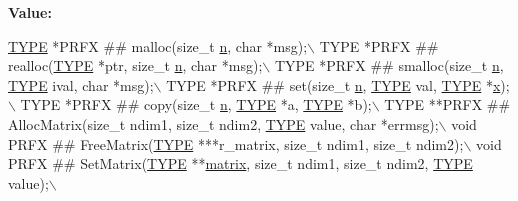 {\bfseries Value\+:}
\begin{DoxyCode}
\hyperlink{a00608_a0bc6723d5d4776ab7cdc646728b775f7}{TYPE}  *PRFX ## malloc(\textcolor{keywordtype}{size\_t} \hyperlink{a00563_a4c2d80ab32fc3a598413ae25e9f2bdce}{n}, \textcolor{keywordtype}{char} *msg);\(\backslash\)
  TYPE  *PRFX ## realloc(\hyperlink{a00608_a0bc6723d5d4776ab7cdc646728b775f7}{TYPE} *ptr, \textcolor{keywordtype}{size\_t} \hyperlink{a00563_a4c2d80ab32fc3a598413ae25e9f2bdce}{n}, \textcolor{keywordtype}{char} *msg);\(\backslash\)
  TYPE  *PRFX ## smalloc(\textcolor{keywordtype}{size\_t} \hyperlink{a00563_a4c2d80ab32fc3a598413ae25e9f2bdce}{n}, \hyperlink{a00608_a0bc6723d5d4776ab7cdc646728b775f7}{TYPE} ival, \textcolor{keywordtype}{char} *msg);\(\backslash\)
  TYPE  *PRFX ## \textcolor{keyword}{set}(\textcolor{keywordtype}{size\_t} \hyperlink{a00563_a4c2d80ab32fc3a598413ae25e9f2bdce}{n}, \hyperlink{a00608_a0bc6723d5d4776ab7cdc646728b775f7}{TYPE} val, \hyperlink{a00608_a0bc6723d5d4776ab7cdc646728b775f7}{TYPE} *\hyperlink{a00020_ac98c3bb25378222646e977292011625f}{x});\(\backslash\)
  TYPE  *PRFX ## copy(\textcolor{keywordtype}{size\_t} \hyperlink{a00563_a4c2d80ab32fc3a598413ae25e9f2bdce}{n}, \hyperlink{a00608_a0bc6723d5d4776ab7cdc646728b775f7}{TYPE} *a, \hyperlink{a00608_a0bc6723d5d4776ab7cdc646728b775f7}{TYPE} *b);\(\backslash\)
  TYPE **PRFX ## AllocMatrix(\textcolor{keywordtype}{size\_t} ndim1, \textcolor{keywordtype}{size\_t} ndim2, \hyperlink{a00608_a0bc6723d5d4776ab7cdc646728b775f7}{TYPE} value, \textcolor{keywordtype}{char} *errmsg);\(\backslash\)
  void   PRFX ## FreeMatrix(\hyperlink{a00608_a0bc6723d5d4776ab7cdc646728b775f7}{TYPE} ***r\_matrix, \textcolor{keywordtype}{size\_t} ndim1, \textcolor{keywordtype}{size\_t} ndim2);\(\backslash\)
  void   PRFX ## SetMatrix(\hyperlink{a00608_a0bc6723d5d4776ab7cdc646728b775f7}{TYPE} **\hyperlink{a01014_af07ff1035f34d77764ff516f110e6832}{matrix}, \textcolor{keywordtype}{size\_t} ndim1, \textcolor{keywordtype}{size\_t} ndim2, 
      \hyperlink{a00608_a0bc6723d5d4776ab7cdc646728b775f7}{TYPE} value);\(\backslash\)
\end{DoxyCode}
